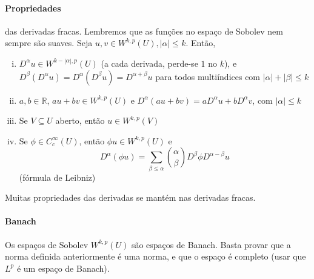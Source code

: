 \documentclass[11pt]{article}
\newcommand{\R}{\mathbb{R}}
\begin{document}

\paragraph{Propriedades} das derivadas fracas. Lembremos que as funções no espaço de Sobolev nem sempre são suaves. Seja \( u,v \in W^{k,p}(U), |\alpha| \leq k \). Então, \begin{enumerate}[(i)]
	\item \( D^\alpha u \in W^{k-|\alpha|, p}(U) \) (a cada derivada, perde-se \( 1 \) no \( k \)), e\\ \( D^\beta(D^\alpha u)=D^\alpha(D^\beta u) = D^{\alpha + \beta}u \) para todos multiíndices com \( |\alpha|+ |\beta| \leq k \)
	\item \(a, b \in \R \), \( au + bv \in W^{k,p}(U) \) e \( D^\alpha(au +bv) = aD^\alpha u + bD^\alpha v \), com \( |\alpha|\leq k \)
	\item Se \( V \subseteq U \) aberto, então \( u \in W^{k,p}(V) \)
	\item Se \( \phi \in C^\infty_c(U) \), então \( \phi u \in W^{k,p}(U) \) e \[ D^\alpha(\phi u) = \sum_{\beta \leq \alpha} \binom{\alpha}{\beta} D^\beta \phi D^{\alpha - \beta}u \] (fórmula de Leibniz)
\end{enumerate}

Muitas propriedades das derivadas se mantém nas derivadas fracas.

\paragraph{Banach} Os espaços de Sobolev \( W^{k,p}(U) \) são espaços de Banach. Basta provar que a norma definida anteriormente é uma norma, e que o espaço é completo (usar que \( L^p \) é um espaço de Banach).
\end{document}

